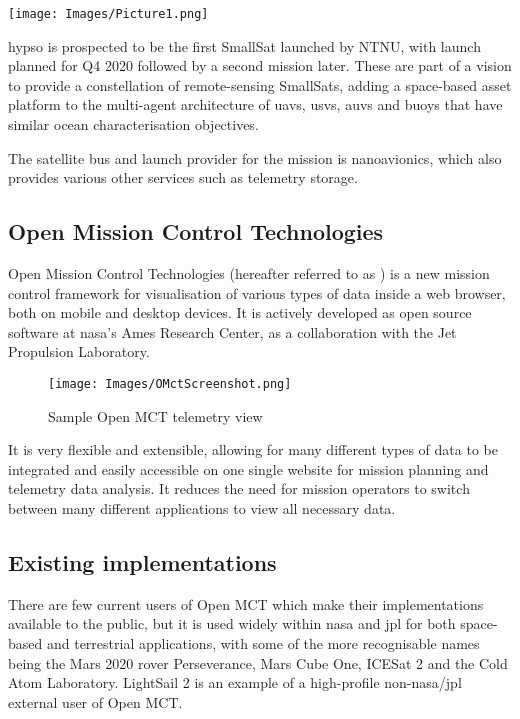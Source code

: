 \begin{center}
\texttt{[image: Images/Picture1.png]}
\end{center}

\acrshort{hypso} is prospected to be the first SmallSat launched by NTNU, with launch planned for Q4 2020 followed by a second mission later. These are part of a vision to provide a constellation of remote-sensing SmallSats, adding a space-based asset platform to the multi-agent architecture of \acrshort{uav}s, \acrshort{usv}s, \acrshort{auv}s and buoys that have similar ocean characterisation objectives.

The satellite bus and launch provider for the mission is \Gls{nanoavionics}, which also provides various other services such as telemetry storage. 

\subsection{Open Mission Control Technologies}
Open Mission Control Technologies (hereafter referred to as ) is a new mission control framework for visualisation of various types of data inside a web browser, both on mobile and desktop devices. It is actively developed as open source software at \acrshort{nasa}'s Ames Research Center, as a collaboration with the Jet Propulsion Laboratory. 

\begin{figure}[ht]
    \centering
    \texttt{[image: Images/OMctScreenshot.png]}
    \caption{Sample Open MCT telemetry view \cite{omct_intro}}
    \label{fig:omctdemo}
\end{figure}

It is very flexible and extensible, allowing for many different types of data to be integrated and easily accessible on one single website for mission planning and \gls{telemetry} data analysis. It reduces the need for mission operators to switch between many different applications to view all necessary data. \cite{dev_interview} \cite{mctos}


\subsection{Existing implementations}
There are few current users of Open MCT which make their implementations available to the public, but it is used widely within \acrshort{nasa} and \acrshort{jpl} for both space-based and terrestrial applications, with some of the more recognisable names being the Mars 2020 rover Perseverance, Mars Cube One, ICESat 2 and the Cold Atom Laboratory. LightSail 2 is an example of a high-profile non-\acrshort{nasa}/\acrshort{jpl} external user of Open MCT. \cite{omct_users}

